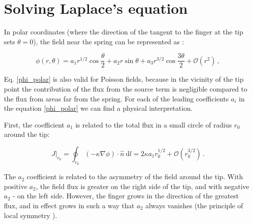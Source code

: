 \documentclass[]{pracamgr}
\begin{document}
  \section{Solving Laplace's equation}\label{chapter:solving}
    
    In polar coordinates (where the direction of the tangent to the finger at the tip sets $\theta = 0$), the field near the spring can be represented as \cite{derrida1992needle , petroff2013bifurcation}:
    
    \begin{equation}\label{phi_polar}
      \phi(r,\theta)=a_1r^{1/2}\cos\frac{\theta}{2}+a_2r \sin \theta+a_3 r^{3/2} \cos\frac{3\theta}{2}+\mathcal{O}\left(r^2\right) \,,
    \end{equation}

    Eq. \eqref{phi_polar} is also valid for Poisson fields, because in the vicinity of the tip point the contribution of the flux from the source term is negligible compared to the flux from areas far from the spring. For each of the leading coefficients $a_i$ in the equation \eqref{phi_polar} we can find a physical interpretation.

    First, the coefficient $a_1$ is related to the total flux in a small circle of radius $r_0$ around the tip: 
    
    \begin{equation}\label{circle}
      J|_{r_0} = \oint_{r_0} (-\kappa \nabla \phi) \cdot \hat{n} \ \textrm{d}l = 2 \kappa a_1 r_0^{1/2} + \mathcal{O}\left(r_0^{3/2}\right) \,.
    \end{equation}

    The $a_2$ coefficient is related to the asymmetry of the field around the tip. With positive $a_2$, the field flux is greater on the right side of the tip, and with negative $a_2$ - on the left side. However, the finger grows in the direction of the greatest flux, and in effect grows in such a way that $a_2$ always vanishes (the principle of local symmetry \cite{cohen2015path}).
    
\end{document}
